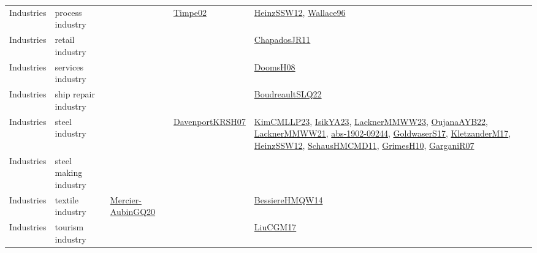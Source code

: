 {\begin{longtable}{llp{6cm}p{6cm}p{6cm}}
Industries & process industry &  & \href{articles/Timpe02.pdf}{Timpe02}\cite{Timpe02} & \href{articles/HeinzSSW12.pdf}{HeinzSSW12}\cite{HeinzSSW12}, \href{articles/Wallace96.pdf}{Wallace96}\cite{Wallace96}\\
Industries & retail industry &  &  & \href{papers/ChapadosJR11.pdf}{ChapadosJR11}\cite{ChapadosJR11}\\
Industries & services industry &  &  & \href{papers/DoomsH08.pdf}{DoomsH08}\cite{DoomsH08}\\
Industries & ship repair industry &  &  & \href{papers/BoudreaultSLQ22.pdf}{BoudreaultSLQ22}\cite{BoudreaultSLQ22}\\
Industries & steel industry &  & \href{papers/DavenportKRSH07.pdf}{DavenportKRSH07}\cite{DavenportKRSH07} & \href{papers/KimCMLLP23.pdf}{KimCMLLP23}\cite{KimCMLLP23}, \href{articles/IsikYA23.pdf}{IsikYA23}\cite{IsikYA23}, \href{articles/LacknerMMWW23.pdf}{LacknerMMWW23}\cite{LacknerMMWW23}, \href{papers/OujanaAYB22.pdf}{OujanaAYB22}\cite{OujanaAYB22}, \href{papers/LacknerMMWW21.pdf}{LacknerMMWW21}\cite{LacknerMMWW21}, \href{articles/abs-1902-09244.pdf}{abs-1902-09244}\cite{abs-1902-09244}, \href{papers/GoldwaserS17.pdf}{GoldwaserS17}\cite{GoldwaserS17}, \href{papers/KletzanderM17.pdf}{KletzanderM17}\cite{KletzanderM17}, \href{articles/HeinzSSW12.pdf}{HeinzSSW12}\cite{HeinzSSW12}, \href{articles/SchausHMCMD11.pdf}{SchausHMCMD11}\cite{SchausHMCMD11}, \href{papers/GrimesH10.pdf}{GrimesH10}\cite{GrimesH10}, \href{papers/GarganiR07.pdf}{GarganiR07}\cite{GarganiR07}\\
Industries & steel making industry &  &  & \\
Industries & textile industry & \href{papers/Mercier-AubinGQ20.pdf}{Mercier-AubinGQ20}\cite{Mercier-AubinGQ20} &  & \href{papers/BessiereHMQW14.pdf}{BessiereHMQW14}\cite{BessiereHMQW14}\\
Industries & tourism industry &  &  & \href{papers/LiuCGM17.pdf}{LiuCGM17}\cite{LiuCGM17}\\

\end{longtable}}
